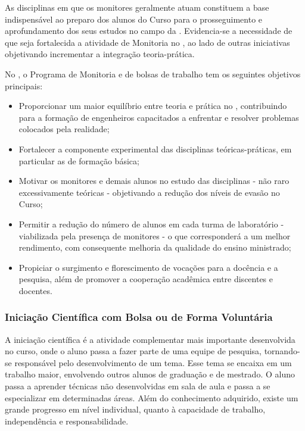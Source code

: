 \documentclass{paper}
\begin{document}
As disciplinas em que os monitores geralmente atuam constituem a base indispensável ao preparo dos alunos do Curso para o prosseguimento e aprofundamento dos seus estudos no campo da \NOMEENG. Evidencia-se a necessidade de que seja fortalecida a atividade de Monitoria no \NOMECURSO, ao lado de outras iniciativas objetivando incrementar a integração teoria-prática.

No \NOMECURSO, o Programa de Monitoria e de bolsas de trabalho tem os seguintes objetivos principais:

\begin{itemize}
\item Proporcionar um maior equilíbrio entre teoria e prática no \NOMECURSO, contribuindo para a formação de engenheiros capacitados a enfrentar e resolver problemas colocados pela realidade;
\item Fortalecer a componente experimental das disciplinas teóricas-práticas, em particular as de formação básica;
\item Motivar os monitores e demais alunos no estudo das disciplinas - não raro excessivamente teóricas - objetivando a redução dos níveis de evasão no Curso;
\item Permitir a redução do número de alunos em cada turma de laboratório - viabilizada pela presença de monitores - o que corresponderá a um melhor rendimento, com consequente melhoria da qualidade do ensino ministrado;
\item Propiciar o surgimento e florescimento de vocações para a docência e a pesquisa, além de promover a cooperação acadêmica entre discentes e docentes.
\end{itemize}


\subsubsection{Iniciação Científica com Bolsa ou de Forma Voluntária}

A iniciação científica é a atividade complementar mais importante desenvolvida no curso, onde
o aluno passa a fazer parte de uma equipe de pesquisa, tornando-se responsável pelo
desenvolvimento de um tema. Esse tema se encaixa em um trabalho maior,
envolvendo outros alunos de graduação e de mestrado. O aluno passa a
aprender técnicas não desenvolvidas em sala de aula e passa a se especializar em
determinadas áreas. Além do conhecimento adquirido, existe um grande progresso em
nível individual, quanto à capacidade de trabalho, independência e responsabilidade.
\end{document}
